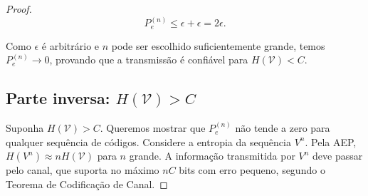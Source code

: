 \begin{proof}
\begin{equation}
P_e^{(n)} \leq \epsilon + \epsilon = 2\epsilon.
\end{equation}

Como $\epsilon$ é arbitrário e $n$ pode ser escolhido suficientemente grande,
temos $P_e^{(n)} \to 0$, provando que a transmissão é confiável para
$H(\mathcal{V}) < C$.



\subsection*{Parte inversa: $H(\mathcal{V}) > C$}
Suponha $H(\mathcal{V}) > C$. Queremos mostrar que $P_e^{(n)}$ não tende a zero
para qualquer sequência de códigos. Considere a entropia da sequência $V^n$.
Pela AEP, $H(V^n) \approx n H(\mathcal{V})$ para $n$ grande. A informação
transmitida por $V^n$ deve passar pelo canal, que suporta no máximo $nC$ bits
com erro pequeno, segundo o Teorema de Codificação de Canal.


\end{proof}
